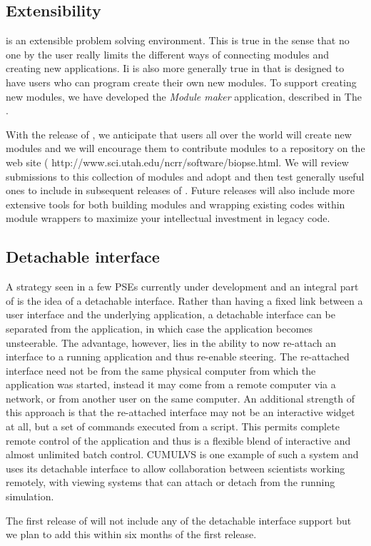 


\subsection{Extensibility}
\label{sec:con-extend} 

\SR{} is an extensible  problem solving environment.
This is true in the sense that no one by the user really limits the
different ways of connecting modules and creating new applications.  Ii is
also more generally true in that \SR{} is designed to have users who can
program create their own new modules.  To support creating new modules, we
have developed the \emph{Module maker} application, described in The
.

With the release of \SR{}, we anticipate that users all over the world will
create new modules and we will encourage them to contribute modules to a
repository on the \PSE{} web site 
(
{http://www.sci.utah.edu/ncrr/software/biopse.html}.  We will review
submissions to this collection of modules and adopt and then test generally
useful ones to include in subsequent releases of \PSE{}.  Future releases
will also include more extensive tools for both building modules and
wrapping existing codes within \SR{} module wrappers to maximize your
intellectual investment in legacy code.


\subsection{Detachable interface}
\label{sec:con-detach} 

A strategy seen in a few PSEs currently under development and an integral
part of \SR{} is the idea of a detachable interface.  Rather than having a
fixed link between a user interface and the underlying application, a
detachable interface can be separated from the application, in which case
the application becomes unsteerable.  The advantage, however, lies in the
ability to now re-attach an interface to a running application and thus
re-enable steering.  The re-attached interface need not be from the same
physical computer from which the application was started, instead it may
come from a remote computer via a network, or from another user on the same
computer.  An additional strength of this approach is that the re-attached
interface may not be an interactive widget at all, but a set of commands
executed from a script.  This permits complete remote control of the
application and thus is a flexible blend of interactive and almost
unlimited batch control.  CUMULVS  is one example of such a
system and uses its detachable interface to allow collaboration between
scientists working remotely, with viewing systems that can attach or detach
from the running simulation.


The first release of \SR{} will not include any of the detachable interface
support but we plan to add this within six months of the first release.

